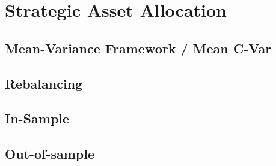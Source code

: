 \newpage

\section{Strategic Asset Allocation}
 
\subsection{Mean-Variance Framework / Mean C-Var}
 
\subsection{Rebalancing}
 
\subsection{In-Sample}

\subsection{Out-of-sample} 